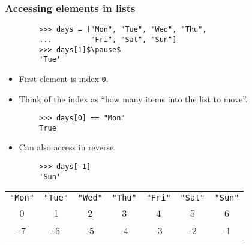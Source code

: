 \documentclass[presentation]{beamer}
\begin{document}
	\begin{frame}[fragile]
		\frametitle{Accessing elements in lists}

		
		\begin{lstlisting}
		>>> days = ["Mon", "Tue", "Wed", "Thu",
		...         "Fri", "Sat", "Sun"]
		>>> days[1]$\pause$
		'Tue'
		\end{lstlisting}
		
		\pause
		
		\vspace{-3mm}
		
		\begin{itemize}
			\item First element is index \lstinline|0|.
			\item Think of the index as ``how many items into the list to move''.
		\end{itemize}
		
		\begin{lstlisting}
		>>> days[0] == "Mon"
		True
		\end{lstlisting}

		\pause
		
		\vspace{-3mm}
		
		\begin{itemize}
			\item Can also access in reverse.
		\end{itemize}
		
		\begin{lstlisting}
		>>> days[-1]
		'Sun'
		\end{lstlisting}
	
		
		\pause
		
		\begin{table}
			\vspace{-2mm}
			\centering
			\begin{tabular}[c]{ccccccc}
				\lstinline|"Mon"| & \lstinline|"Tue"| & \lstinline|"Wed"| & \lstinline|"Thu"| & \lstinline|"Fri"| & \lstinline|"Sat"| & \lstinline|"Sun"| \\
				0 & 1 & 2 & 3 & 4 & 5 & 6 \\
				-7 & -6 & -5 & -4 & -3 & -2 & -1
			\end{tabular}
		\end{table}
	\end{frame}
	
\end{document}
